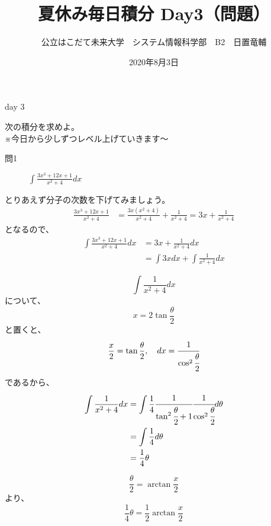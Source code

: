 \documentclass[dvipdfmx,uplatex]{jsarticle}
\title{夏休み毎日積分 Day3（問題）}
\author{公立はこだて未来大学　システム情報科学部　B2　日置竜輔}
\date{2020年8月3日}
\begin{document}
\maketitle

\begin{itembox}[c]{day 3 }
    \begin{center}
        次の積分を求めよ。\\
        ※今日から少しずつレベル上げていきます〜
    \end{center}
\end{itembox}
\begin{description}
    \item [問1] $ \displaystyle \int \frac{3x^3+12x+1}{x^2+4} dx $
\end{description}

とりあえず分子の次数を下げてみましょう。\\
\begin{align*}
  \frac{3x ^ 3 + 12x + 1}{x ^ 2 + 4}
  &=\frac{3x(x ^ 2 + 4)}{x ^ 2 + 4} + \frac{1}{x ^ 2 + 4} = 3x + \frac{1}{x ^ 2 + 4}
  \end{align*}
となるので、
\begin{align*}
    \int \frac{3x ^ 3 + 12x + 1}{x ^ 2 + 4} dx
    &= 3x + \frac{1}{x ^ 2 + 4} dx \\
    &= \int{3x}dx + \int\frac{1}{x ^ 2 + 4} dx
\end{align*}

\begin{equation*}
    \int \frac{1}{x ^ 2 + 4} dx
\end{equation*}
について、
\begin{equation*}
  x = 2 \tan \frac{\theta}{2}
\end{equation*}
と置くと、
\begin{equation*}
    \frac{x}{2}= \tan \frac{\theta}{2}, \quad dx = \cfrac{1}{\cos ^ 2\cfrac{\theta}{2}}
\end{equation*}
であるから、
\begin{align*}
    \int\frac{1}{x ^ 2 + 4}dx
    &=\int \frac{1}{4}\cfrac{1}{\tan ^ 2\cfrac{\theta}{2}+1}\cfrac{1}{\cos ^ 2\cfrac{\theta}{2}} d\theta \\
    &= \int \frac{1}{4}d\theta\\
    &= \frac{1}{4}\theta
\end{align*}

\begin{equation*}
\frac{\theta}{2} = \arctan\frac{x}{2}
\end{equation*}
より、
\begin{equation*}
\frac{1}{4}\theta = \frac{1}{2}\arctan\frac{x}{2}
\end{equation*}
\end{document}
